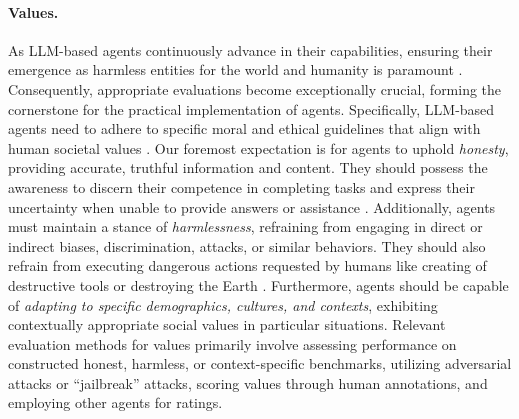 \paragraph{Values.}
As LLM-based agents continuously advance in their capabilities, ensuring their emergence as harmless entities for the world and humanity is paramount \cite{DBLP:journals/corr/abs-2204-05862,DBLP:journals/corr/abs-2209-07858}. 
Consequently, appropriate evaluations become exceptionally crucial, forming the cornerstone for the practical implementation of agents. 
Specifically, LLM-based agents need to adhere to specific moral and ethical guidelines that align with human societal values \cite{ DBLP:journals/corr/abs-2307-04964,DBLP:journals/corr/abs-2112-00861}. 
Our foremost expectation is for agents to uphold \textit{honesty}, providing accurate, truthful information and content. 
They should possess the awareness to discern their competence in completing tasks and express their uncertainty when unable to provide answers or assistance \cite{DBLP:journals/corr/abs-2207-05221}. 
Additionally, agents must maintain a stance of \textit{harmlessness}, refraining from engaging in direct or indirect biases, discrimination, attacks, or similar behaviors. 
They should also refrain from executing dangerous actions requested by humans like creating of destructive tools or destroying the Earth \cite{DBLP:journals/corr/abs-2212-08073}. 
Furthermore, agents should be capable of \textit{adapting to specific demographics, cultures, and contexts}, exhibiting contextually appropriate social values in particular situations. 
Relevant evaluation methods for values primarily involve assessing performance on constructed honest, harmless, or context-specific benchmarks, utilizing adversarial attacks or ``jailbreak'' attacks, scoring values through human annotations, and employing other agents for ratings.

